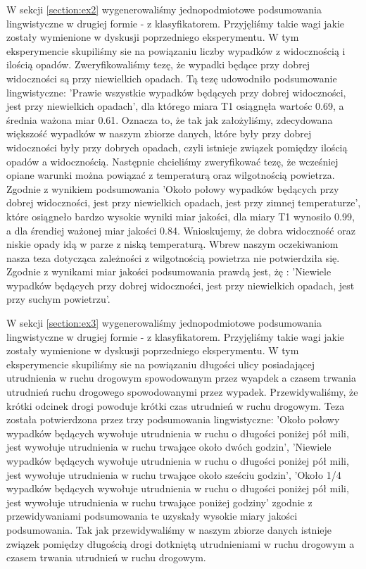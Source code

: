 \documentclass{classrep}
\begin{document}
W sekcji \ref{section:ex2} wygenerowaliśmy jednopodmiotowe podsumowania lingwistyczne w drugiej formie - z klasyfikatorem. Przyjęliśmy takie wagi jakie zostały wymienione w dyskusji poprzedniego eksperymentu. W tym eksperymencie skupiliśmy sie na powiązaniu liczby wypadków z widocznością i ilością opadów. Zweryfikowaliśmy tezę, że wypadki będące przy dobrej widoczności są przy niewielkich opadach. Tą tezę udowodniło podsumowanie lingwistyczne: 'Prawie wszystkie wypadków będących przy dobrej widoczności, jest przy niewielkich opadach', dla którego miara T1 osiągnęła wartośc 0.69, a średnia ważona miar 0.61. Oznacza to, że tak jak założyliśmy, zdecydowana większość wypadków w naszym zbiorze danych, które były przy dobrej widoczności były przy dobrych opadach, czyli istnieje związek pomiędzy ilością opadów a widocznością. Następnie chcieliśmy zweryfikować tezę,  że wcześniej opiane warunki można powiązać z temperaturą oraz wilgotnością powietrza. Zgodnie z wynikiem podsumowania 'Około połowy wypadków będących przy dobrej widoczności, jest przy niewielkich opadach, jest przy zimnej temperaturze', które osiągneło bardzo wysokie wyniki miar jakości, dla miary T1 wynosiło 0.99, a dla śrendiej ważonej miar jakości 0.84. Wnioskujemy, że dobra widoczność oraz niskie opady idą w parze z niską temperaturą. Wbrew naszym oczekiwaniom nasza teza dotycząca zależności z wilgotnością powietrza nie potwierdziła się. Zgodnie z wynikami miar jakości podsumowania prawdą jest, żę : 'Niewiele wypadków będących przy dobrej widoczności, jest przy niewielkich opadach, jest przy suchym powietrzu'. 

W sekcji \ref{section:ex3} wygenerowaliśmy jednopodmiotowe podsumowania lingwistyczne w drugiej formie - z klasyfikatorem. Przyjęliśmy takie wagi jakie zostały wymienione w dyskusji poprzedniego eksperymentu. W tym eksperymencie skupiliśmy sie na powiązaniu długości ulicy posiadającej utrudnienia w ruchu drogowym spowodowanym przez wyapdek a czasem trwania utrudnień ruchu drogowego spowodowanymi przez wypadek. Przewidywaliśmy, że krótki odcinek drogi powoduje krótki czas utrudnień w ruchu drogowym. Teza została potwierdzona przez trzy podsumowania lingwistyczne: 'Około połowy wypadków będących wywołuje utrudnienia w ruchu o długości poniżej pół mili, jest wywołuje utrudnienia w ruchu trwające około dwóch godzin', 'Niewiele wypadków będących wywołuje utrudnienia w ruchu o długości poniżej pół mili, jest wywołuje utrudnienia w ruchu trwające około sześciu godzin', 'Około 1/4 wypadków będących wywołuje utrudnienia w ruchu o długości poniżej pół mili, jest wywołuje utrudnienia w ruchu trwające poniżej godziny' zgodnie z przewidywaniami podsumowania te uzyskały wysokie miary jakości podsumowania. Tak jak przewidywaliśmy w naszym zbiorze danych istnieje związek pomiędzy długością drogi dotkniętą utrudnieniami w ruchu drogowym a czasem trwania utrudnień w ruchu drogowym. 
\end{document}
